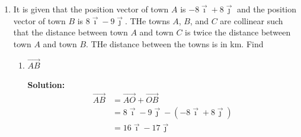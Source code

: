 \documentclass{report}
\newcommand{\sol}{\textbf{Solution:}}
\begin{document}
\begin{enumerate}[leftmargin=*]
          \sol{}
          \begin{align*}
              y                          & = 2x^2 - 4x + 6                 \\
              \dfrac{dy}{dx}             & = 4x - 4                        \\
              \dfrac{\delta y}{\delta x} & \approx \dfrac{dy}{dx}          \\
              \delta y                   & \approx \dfrac{dy}{dx} \delta x
          \end{align*}
          When $x = 2$, $\delta x = 3\%x = 0.03x = 0.06$, $\dfrac{dy}{dx} = 4(2) - 4 = 4$. Therefore
          \begin{align*}
              \delta y & \approx 4 \times 0.06 \\
                       & = 0.24
          \end{align*}
          Therefore the percentage change in $y$ is
          \begin{align*}
              \dfrac{\delta y}{y} \times 100 & = \dfrac{0.24}{2(2)^2 - 4(2) + 6} \times 100 \\
                                             & = \dfrac{0.24}{6} \times 100                 \\
                                             & = 4\%
          \end{align*}

    \item It is given that the position vector of town $A$ is $-8\vec{\imath} +
              8\vec{\jmath}$ and the position vector of town $B$ is $8\vec{\imath} -
              9\vec{\jmath}$. THe towns $A$, $B$, and $C$ are collinear such that the
          distance between town $A$ and town $C$ is twice the distance between town $A$
          and town $B$. THe distance between the towns is in km. Find
          \begin{enumerate}
              \item $\overrightarrow{AB}$

                    \sol{}
                    \begin{align*}
                        \overrightarrow{AB} & = \overrightarrow{AO} + \overrightarrow{OB}                        \\
                                            & = 8\vec{\imath} - 9\vec{\jmath} - (-8\vec{\imath} + 8\vec{\jmath}) \\
                                            & = 16\vec{\imath} - 17\vec{\jmath}
                    \end{align*}


\end{enumerate}
\end{enumerate}
\end{document}
